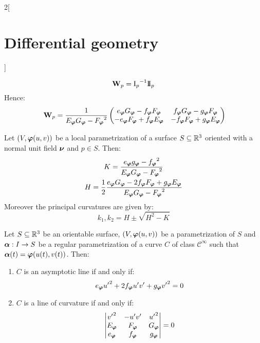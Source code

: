 \documentclass[../../../main_math.tex]{subfiles}
\begin{document}
\begin{multicols}{2}[\section{Differential geometry}]
\begin{proposition}
    $$\boldsymbol{\mathrm{W}}_p={\mathrm{I}_p}^{-1}\mathrm{I\!I}_p$$
    Hence: $$\boldsymbol{\mathrm{W}}_p=\frac{1}{E_{\boldsymbol{\mathrm{\varphi}}}G_{\boldsymbol{\mathrm{\varphi}}}-{F_{\boldsymbol{\mathrm{\varphi}}}}^2}
      \begin{pmatrix}
        e_{\boldsymbol{\mathrm{\varphi}}}G_{\boldsymbol{\mathrm{\varphi}}}-f_{\boldsymbol{\mathrm{\varphi}}}F_{\boldsymbol{\mathrm{\varphi}}}  & f_{\boldsymbol{\mathrm{\varphi}}}G_{\boldsymbol{\mathrm{\varphi}}}-g_{\boldsymbol{\mathrm{\varphi}}}F_{\boldsymbol{\mathrm{\varphi}}}  \\
        -e_{\boldsymbol{\mathrm{\varphi}}}F_{\boldsymbol{\mathrm{\varphi}}}+f_{\boldsymbol{\mathrm{\varphi}}}E_{\boldsymbol{\mathrm{\varphi}}} & -f_{\boldsymbol{\mathrm{\varphi}}}F_{\boldsymbol{\mathrm{\varphi}}}+g_{\boldsymbol{\mathrm{\varphi}}}E_{\boldsymbol{\mathrm{\varphi}}}
      \end{pmatrix}\!\!$$
  \end{proposition}
  \begin{corollary}
    Let $(V,\boldsymbol{\mathrm{\varphi}}(u,v))$ be a local parametrization of a surface $S\subseteq\mathbb{R}^3$ oriented with a normal unit field $\boldsymbol{\mathrm{\nu}}$ and $p\in S$. Then:
    \begin{gather*}
      K =\frac{e_{\boldsymbol{\mathrm{\varphi}}}g_{\boldsymbol{\mathrm{\varphi}}}-{f_{\boldsymbol{\mathrm{\varphi}}}}^2}{E_{\boldsymbol{\mathrm{\varphi}}}G_{\boldsymbol{\mathrm{\varphi}}}-{F_{\boldsymbol{\mathrm{\varphi}}}}^2}               \\
      H =\frac{1}{2}\frac{e_{\boldsymbol{\mathrm{\varphi}}}G_{\boldsymbol{\mathrm{\varphi}}}-2f_{\boldsymbol{\mathrm{\varphi}}}F_{\boldsymbol{\mathrm{\varphi}}}+g_{\boldsymbol{\mathrm{\varphi}}}E_{\boldsymbol{\mathrm{\varphi}}}}{E_{\boldsymbol{\mathrm{\varphi}}}G_{\boldsymbol{\mathrm{\varphi}}}-{F_{\boldsymbol{\mathrm{\varphi}}}}^2}
    \end{gather*}
    Moreover the principal curvatures are given by: $$k_1,k_2=H\pm\sqrt{H^2-K}$$
  \end{corollary}
  \begin{proposition}
    Let $S\subseteq\mathbb{R}^3$ be an orientable surface, $(V,\boldsymbol{\mathrm{\varphi}}(u,v))$ be a parametrization of $S$ and $\boldsymbol{\mathrm{\alpha}}:I\rightarrow S$ be a regular parametrization of a curve $C$ of class $\mathcal{C}^\infty$ such that $\boldsymbol{\mathrm{\alpha}}(t)=\boldsymbol{\mathrm{\varphi}}(u(t),v(t))$. Then:
    \begin{enumerate}
      \item $C$ is an asymptotic line if and only if: $$e_{\boldsymbol{\mathrm{\varphi}}}{u'}^2+2f_{\boldsymbol{\mathrm{\varphi}}}u'v'+g_{\boldsymbol{\mathrm{\varphi}}}{v'}^2=0$$
      \item $C$ is a line of curvature if and only if:
            $$
              \begin{vmatrix}
                {v'}^2         & -u'v'          & {u'}^2         \\
                E_{\boldsymbol{\mathrm{\varphi}}} & F_{\boldsymbol{\mathrm{\varphi}}} & G_{\boldsymbol{\mathrm{\varphi}}} \\
                e_{\boldsymbol{\mathrm{\varphi}}} & f_{\boldsymbol{\mathrm{\varphi}}} & g_{\boldsymbol{\mathrm{\varphi}}}
              \end{vmatrix}=0
            $$
    \end{enumerate}
  \end{proposition}

\end{multicols}
\end{document}
